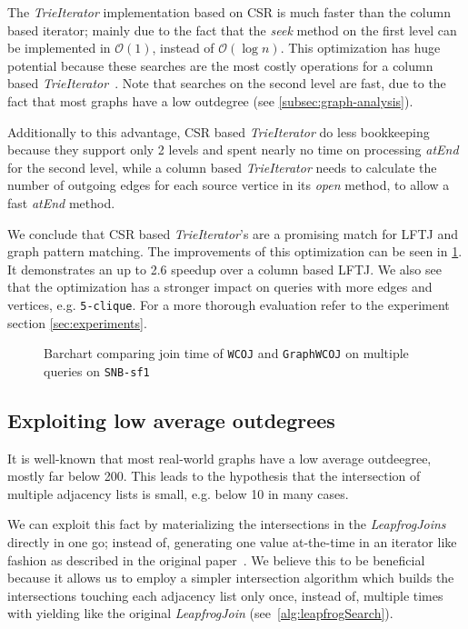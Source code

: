 The \textit{TrieIterator} implementation based on \textsc{CSR} is much faster than the column based iterator; mainly due to the fact
that the \textit{seek} method on the first level can be implemented in $\mathcal{O}(1)$, instead of $\mathcal{O}(\log n)$.
This optimization has huge potential because these searches are the most costly operations for a column based
\textit{TrieIterator}~\cite{myria-detailed}.
Note that searches on the second level are fast, due to the fact that most graphs have a low outdegree (see
\cref{subsec:graph-analysis}).

Additionally to this advantage, \textsc{CSR} based \textit{TrieIterator} do less bookkeeping because they support only 2 levels and spent
nearly no time on processing \textit{atEnd} for the second level, while a column based \textit{TrieIterator} needs to calculate the
number of outgoing edges for each source vertice in its \textit{open} method, to allow a fast \textit{atEnd} method.

We conclude that \textsc{CSR} based \textit{TrieIterator}'s are a promising match for \textsc{LFTJ} and graph pattern matching.
The improvements of this optimization can be seen in \cref{fig:wcoj-vs-graphWCOJ}.
It demonstrates an up to 2.6 speedup over a column based \textsc{LFTJ}. %
We also see that the optimization has a stronger impact on queries with more edges and vertices, e.g. \texttt{5-clique}.
For a more thorough evaluation refer to the experiment section \ref{sec:experiments}.

\begin{figure}
\centering
\caption{Barchart comparing join time of \texttt{WCOJ} and \texttt{GraphWCOJ} on multiple queries on \texttt{SNB-sf1}}
\label{fig:wcoj-vs-graphWCOJ}
\end{figure}

\subsection{Exploiting low average outdegrees} \label{subsec:graphWCOJ-materalization}

It is well-known that most real-world graphs have a low average outdeegree, mostly far below 200.
This leads to the hypothesis that the intersection of multiple adjacency lists is small, e.g. below 10 in many cases.

We can exploit this fact by materializing the intersections in the \textit{LeapfrogJoins} directly
in one go; instead of, generating one value at-the-time in an iterator like fashion as described in the
original paper~\cite{lftj}.
We believe this to be beneficial because it allows us to employ a simpler intersection algorithm which builds
the intersections touching each adjacency list only once, instead of, multiple times with yielding like the original
\textit{LeapfrogJoin} (see~\cref{alg:leapfrogSearch}).

